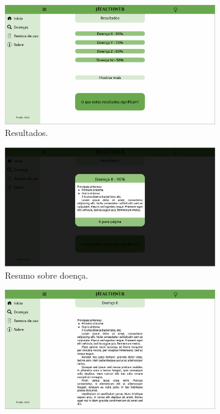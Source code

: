 \begin{figure}[htbp]
	\centering
	\begin{subfigure}{0.49\linewidth}
		\centering
		\includegraphics[width=\linewidth]{figure/prototype/desktop/results.png}
		\caption{Resultados.}
		\label{fig:desktop:results}
	\end{subfigure}
	\hfill
	\begin{subfigure}{0.49\linewidth}
		\centering
		\includegraphics[width=\linewidth]{figure/prototype/desktop/this_disease.png}
		\caption{Resumo sobre doença.}
		\label{fig:desktop:this_disease}
	\end{subfigure}
	\hfill
	\begin{subfigure}{0.49\linewidth}
		\centering
		\includegraphics[width=\linewidth]{figure/prototype/desktop/disease_page.png}

\end{subfigure}
\end{figure}
